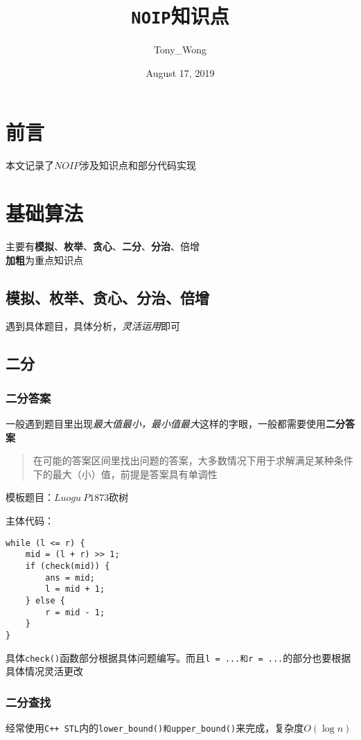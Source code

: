 \documentclass[UTF8]{ctexart}
\author{Tony\_Wong}
\date{August 17, 2019}
\title{\huge \texttt{NOIP}知识点}
\begin{document}


\section{前言}
本文记录了$NOIP$涉及知识点和部分代码实现

\section{基础算法}
主要有\textbf{模拟}、\textbf{枚举}、\textbf{贪心}、\textbf{二分}、\textbf{分治}、倍增\\
\textbf{加粗}为重点知识点

\subsection{模拟、枚举、贪心、分治、倍增}
遇到具体题目，具体分析，\emph{灵活运用}即可

\subsection{二分}
\subsubsection{二分答案}
一般遇到题目里出现\emph{最大值最小，最小值最大}这样的字眼，一般都需要使用\textbf{二分答案}\\

\begin{quote}
	在可能的答案区间里找出问题的答案，大多数情况下用于求解满足某种条件下的最大（小）值，前提是答案具有单调性
\end{quote}

模板题目：$Luogu\ P1873$砍树

主体代码：\\
\begin{lstlisting}
while (l <= r) {
    mid = (l + r) >> 1;
    if (check(mid)) {
        ans = mid;
        l = mid + 1;
    } else {
        r = mid - 1;
    }
}
\end{lstlisting}

具体\texttt{check()}函数部分根据具体问题编写。而且\texttt{l = ...和r = ...}的部分也要根据具体情况灵活更改

\subsubsection{二分查找}
经常使用\texttt{C++\ STL}内的\texttt{lower\_bound()和upper\_bound()}来完成，复杂度$O(\log n)$
\end{document}
